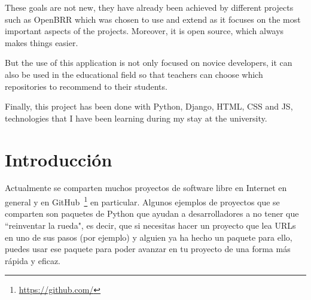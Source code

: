 \documentclass[a4paper, 12pt]{book}
\begin{document}
These goals are not new, they have already been achieved by different projects such as OpenBRR which was chosen to use and extend as it focuses on the most important aspects of the projects. Moreover, it is open source, which always makes things easier.

But the use of this application is not only focused on novice developers, it can also be used in the educational field so that teachers can choose which repositories to recommend to their students. 

Finally, this project has been done with Python, Django, HTML, CSS and JS, technologies that I have been learning during my stay at the university.



\tableofcontents 
\cleardoublepage
\listoffigures %



\cleardoublepage
\chapter{Introducción}
\label{chap:introducción}
\label{sec:intro} %

Actualmente se comparten muchos proyectos de software libre en Internet en general y en GitHub~\cite{website:GitHub}\footnote{\url{https://github.com/}} en particular. Algunos ejemplos de proyectos que se comparten son paquetes de Python que
ayudan a desarrolladores a no tener que ``reinventar la rueda", es decir, que si necesitas hacer un proyecto que lea URLs en uno de sus pasos (por ejemplo) y alguien ya ha hecho un paquete para
ello, puedes usar ese paquete para poder avanzar en tu proyecto de una forma más rápida y eficaz.
\end{document}
